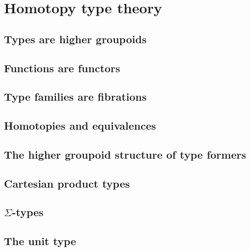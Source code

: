 \chapter{Homotopy type theory}
\label{cha:basics}


\section{Types are higher groupoids}
\label{sec:equality}


\section{Functions are functors}
\label{sec:functors}


\section{Type families are fibrations}
\label{sec:fibrations}


\section{Homotopies and equivalences}
\label{sec:basics-equivalences}


\section{The higher groupoid structure of type formers}
\label{sec:computational}


\section{Cartesian product types}
\label{sec:compute-cartprod}


\section{\texorpdfstring{$\Sigma$}{Σ}-types}
\label{sec:compute-sigma}


\section{The unit type}
\label{sec:compute-unit}


